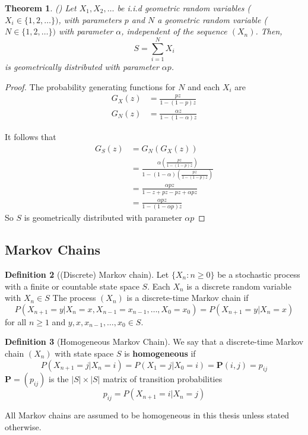 \documentclass{article}
\theoremstyle{plain}
\newtheorem{theorem}{Theorem}[section]
\theoremstyle{definition}
\newtheorem{defn}[theorem]{Definition}
\theoremstyle{remark}
\numberwithin{equation}{section}
\begin{document}
\begin{theorem}\label{thm:geom_sum_geom} (\cite{Nelson1995})
Let $X_1, X_2, \ldots$ be i.i.d geometric random variables ($X_i \in \{1,2,\ldots\})$, with parameters $p$ and $N$ a geometric random variable ($N \in \{1,2,\ldots\})$ with parameter $\alpha$, independent of the sequence $(X_n)$.
Then,
$$
S = \sum_{i = 1}^N X_i
$$
is geometrically distributed with parameter $\alpha p$.
\end{theorem}

\begin{proof}
The probability generating functions for $N$ and each $X_i$ are
\begin{align*}
    G_X(z) &= \frac{p z}{1 - (1 - p)z}\\
    G_{N}(z) &= \frac{\alpha z}{1 - (1 - \alpha)z}
\end{align*}

It follows that
\begin{align*}
    G_S(z) &= G_N(G_X(z))\\
    &= \frac{
    \alpha \left( \frac{p z}{1 - (1 - p)z} \right)
    }{
        1 - (1 - \alpha) \left( \frac{p z}{1 - (1 - p)z} \right)
    }\\
    &= \frac{
        \alpha p z
    }{
        1 - z + pz - pz + \alpha p z
    } \\
    &= \frac{
        \alpha p z
    }{
        1 - (1 - \alpha p) z
    }
\end{align*}
So $S$ is geometrically distributed with parameter $\alpha p$
\end{proof}

\subsection{Markov Chains}

\begin{defn}[(Discrete) Markov chain] \cite{grimmett2001}
Let $\{X_n : n \geq 0\}$ be a stochastic process with a finite or countable state space $S$.
Each $X_n$ is a discrete random variable with $X_n \in S$
The process $(X_n)$ is a discrete-time Markov chain if
$$
P(X_{n + 1} = y | X_n = x, X_{n - 1} = x_{n - 1}, \ldots, X_0 = x_0) = P(X_{n + 1} = y | X_n = x)
$$
for all $n \geq 1$ and $y, x, x_{n-1}, \ldots, x_0 \in S$.
\end{defn}

\begin{defn}[Homogeneous Markov Chain]\cite{grimmett2001}
We say that a discrete-time Markov chain $(X_n)$ with state space $S$ is \textbf{homogeneous} if
$$
P(X_{n + 1} = j | X_n = i) = P(X_{1} = j | X_0 = i) = \mathbf{P}(i,j) = p_{ij}
$$
$\mathbf{P} = (p_{ij})$ is the $|S| \times |S|$ matrix of transition probabilities
$$
p_{ij} = P(X_{n + 1} = i | X_n = j)
$$

All Markov chains are assumed to be homogeneous in this thesis unless stated otherwise.
\end{defn}
\end{document}
